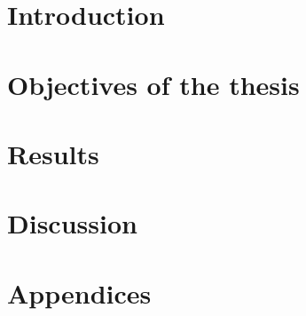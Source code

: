 \documentclass[a4paper,twoside]{ociamthesis}
\begin{document}
\flushbottom
\part{Introduction}




\part{Objectives of the thesis}

\part{Results}




\part{Discussion}

% 

% 
% 


\cleardoublepage{}
\startappendices
\part*{Appendices}
% 




%
\setlength{\baselineskip}{0pt} %
\end{document}
